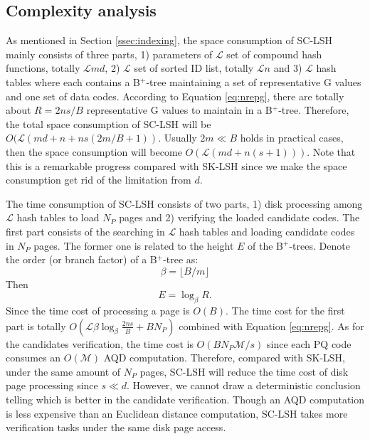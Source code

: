 \documentclass[twocolumn]{svjour3}          %
\begin{document}
\subsection{Complexity analysis}\label{ssec:complex}
As mentioned in Section \ref{ssec:indexing}, the space consumption of SC-LSH mainly consists of three parts, 1) parameters of $\mathcal{L}$ set of compound hash functions, totally $\mathcal{L}md$, 2) $\mathcal{L}$ set of sorted ID list, totally $\mathcal{L}n$ and 3) $\mathcal{L}$ hash tables where each contains a B$^+$-tree maintaining a set of representative G values and one set of data codes. According to Equation \ref{eq:nrepg}, there are totally about $R =2ns/B$ representative G values to maintain in a B$^+$-tree. Therefore, the total space consumption of SC-LSH will be $O(\mathcal{L}(md+n+ns(2m/B+1))$. Usually $2m \ll B$ holds in practical cases, then the space consumption will become $O(\mathcal{L}(md+n(s+1)))$. Note that this is a remarkable progress compared with SK-LSH since we make the space consumption get rid of the limitation from $d$.


The time consumption of SC-LSH consists of two parts, 1) disk processing among $\mathcal{L}$ hash tables to load $N_P$ pages and 2) verifying the loaded candidate codes. The first part consists of the searching in $\mathcal{L}$ hash tables and loading candidate codes in $N_P$ pages. The former one is related to the height $E$ of the B$^+$-trees. Denote the order (or branch factor) of a B$^+$-tree as:
\begin{equation}
\beta=\lfloor B/m\rfloor
\label{eq:ob}
\end{equation}
Then
\begin{equation}
E=\log_{\beta}{R}.
\label{eq:e}
\end{equation} Since the time cost of processing a page is $O(B)$. The time cost for the first part is totally $O(\mathcal{L}\beta\log_{\beta}\frac{2ns}{B}+BN_P)$ combined with Equation \ref{eq:nrepg}.
As for the candidates verification, the time cost is $O(BN_P\mathcal{M}/s)$ since each PQ code consumes an $O(\mathcal{M})$ AQD computation. Therefore, compared with SK-LSH, under the same amount of $N_P$ pages, SC-LSH will reduce the time cost of disk page processing since $s \ll d$. However, we cannot draw a deterministic conclusion telling which is better in the candidate verification. Though an AQD computation is less expensive than an Euclidean distance computation, SC-LSH takes more verification tasks under the same disk page access.
\end{document}

